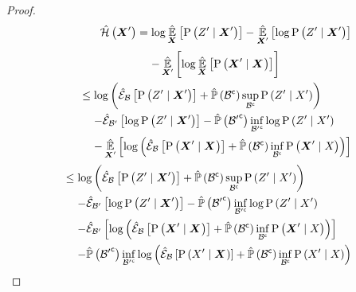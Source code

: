 \begin{proof}
	\begin{align}
		\begin{split}
			\entropyEstimator{\statesRV{}^\prime}&=\log\estimator{\probcond{\observations{}^\prime}{\statesRV{}^\prime}}{\statesRV{}}-\estimator{\log\probcond{\observations{}^\prime}{\statesRV{}^\prime}}{\statesRV{}^\prime}\\
			&\phantomeq-\estimator{\log\estimator{\probcond{\statesRV{}^\prime}{\statesRV{}}}{\statesRV{}}}{\statesRV{}^\prime}
		\end{split}\\
		\begin{split}
			&\leq\log\left(\partialestimator{\probcond{\observations{}^\prime}{\statesRV{}^\prime}}{\subSpace}+\estimatedmeasure{\stcomp{\subSpace}}\sup_{\stcomp{\subSpace}}\probcond{\observations{}^\prime}{\states{}^\prime}\right)\\
			&\phantomeq-\partialestimator{\log\probcond{\observations{}^\prime}{\statesRV{}^\prime}}{\subSpace^\prime}-\estimatedmeasure{\stcomp{\subSpace^\prime}}\inf_{\stcomp{\subSpace^\prime}}\log\probcond{\observations{}^\prime}{\states{}^\prime}\\
			&\phantomeq-\estimator{\log\left(\partialestimator{\probcond{\statesRV{}^\prime}{\statesRV{}}}{\subSpace}+\estimatedmeasure{\stcomp{\subSpace}}\inf_{\stcomp{\subSpace}}\probcond{\statesRV{}^\prime}{\states{}}\right)}{\statesRV{}^\prime}
		\end{split}\\
		\begin{split}
			&\leq\log\left(\partialestimator{\probcond{\observations{}^\prime}{\statesRV{}^\prime}}{\subSpace}+\estimatedmeasure{\stcomp{\subSpace}}\sup_{\stcomp{\subSpace}}\probcond{\observations{}^\prime}{\states{}^\prime}\right)\\
			&\phantomeq-\partialestimator{\log\probcond{\observations{}^\prime}{\statesRV{}^\prime}}{\subSpace^\prime}-\estimatedmeasure{\stcomp{\subSpace^\prime}}\inf_{\stcomp{\subSpace^\prime}}\log\probcond{\observations{}^\prime}{\states{}^\prime}\\
			&\phantomeq-\partialestimator{\log\left(\partialestimator{\probcond{\statesRV{}^\prime}{\statesRV{}}}{\subSpace}+\estimatedmeasure{\stcomp{\subSpace}}\inf_{\stcomp{\subSpace}}\probcond{\statesRV{}^\prime}{\states{}}\right)}{\subSpace^\prime}\\
			&\phantomeq-\estimatedmeasure{\stcomp{\subSpace^\prime}}\inf_{\stcomp{\subSpace^\prime}}\log\left(\partialestimator{\probcond{\states{}^\prime}{\statesRV{}}}{\subSpace}+\estimatedmeasure{\stcomp{\subSpace}}\inf_{\stcomp{\subSpace}}\probcond{\states{}^\prime}{\states{}}\right)

\end{split}
\end{align}
\end{proof}
